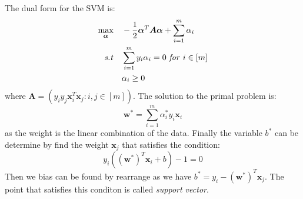 \begin{proposition}
    The dual form for the SVM is:
    \begin{equation*}
    \begin{aligned}
        \max_{\boldsymbol \alpha} \quad &-\frac{1}{2}\boldsymbol \alpha^T\boldsymbol A\boldsymbol \alpha + \sum^m_{i=1}\alpha_i \\
        \text{\emph{s.t}} \quad &\begin{aligned}[t]
            &\sum^m_{i=1}y_i\alpha_i = 0 \text{ \emph{for} } i \in [m] \\
            &\alpha_i \ge 0
        \end{aligned}
    \end{aligned}
    \end{equation*}
    where $\boldsymbol A = (y_iy_j\boldsymbol x_i^T\boldsymbol x_j : i,j\in[m])$. The solution to the primal problem is:
    \begin{equation*}
        \boldsymbol w^* = \sum^m_{i=1}\alpha^*_iy_i\boldsymbol x_i
    \end{equation*}
    as the weight is the linear combination of the data. Finally the variable $b^*$ can be determine by find the weight $\boldsymbol x_j$ that satisfies the condition:
    \begin{equation*}
        y_i((\boldsymbol w^*)^T\boldsymbol x_i + b) - 1 = 0
    \end{equation*}
    Then we bias can be found by rearrange as we have $b^* = y_i- (\boldsymbol w^*)^T\boldsymbol x_j$. The point that satisfies this conditon is called \emph{support vector}.
\end{proposition}
